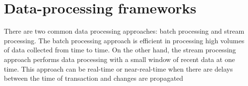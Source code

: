 



\section{ Data-processing frameworks}

There are two common data processing approaches: batch processing and stream processing. The batch processing approach is
efficient in processing high volumes of data collected from time to time. On the other hand,
the stream processing approach performs data processing with a small window of recent
data at one time. This approach can be real-time or near-real-time when there are delays
between the time of transaction and changes are propagated



